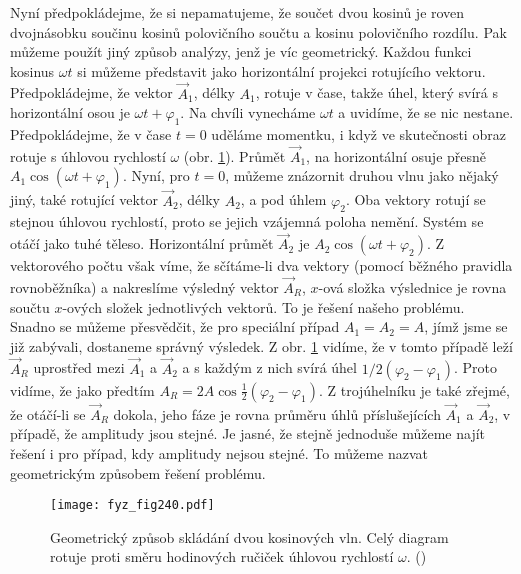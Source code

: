     Nyní předpokládejme, že si nepamatujeme, že součet dvou kosinů je roven dvojnásobku součinu 
    kosinů polovičního součtu a kosinu polovičního rozdílu. Pak můžeme použít jiný způsob analýzy, 
    jenž je víc geometrický. Každou funkci kosinus \(\omega t\) si můžeme představit jako 
    horizontální projekci rotujícího vektoru. Předpokládejme, že vektor \(\vec{A}_1\), délky 
    \(A_1\), rotuje v čase, takže úhel, který svírá s horizontální osou je \(\omega t + 
    \varphi_1\). Na chvíli vynecháme \(\omega t\) a uvidíme, že se nic nestane. Předpokládejme, že 
    v čase \(t=0\) uděláme momentku, i když ve skutečnosti obraz rotuje s úhlovou rychlostí 
    \(\omega\) (obr. \ref{fyz:fig240}). Průmět \(\vec{A}_1\), na horizontální osuje přesně 
    \(A_1\cos(\omega t + \varphi_1)\). Nyní, pro \(t = 0\), můžeme znázornit druhou vlnu jako 
    nějaký jiný, také rotující vektor \(\vec{A}_2\), délky \(A_2\), a pod úhlem \(\varphi_2\). Oba 
    vektory rotují se stejnou úhlovou rychlostí, proto se jejich vzájemná poloha nemění. Systém se 
    otáčí jako tuhé těleso. Horizontální průmět \(\vec{A}_2\) je \(A_2\cos(\omega t + \varphi_2)\). 
    Z vektorového počtu však víme, že sčítáme-li dva vektory (pomocí běžného pravidla rovnoběžníka) 
    a nakreslíme výsledný vektor \(\vec{A}_R\), \(x\)-ová složka výslednice je rovna součtu 
    \(x\)-ových složek jednotlivých vektorů. To je řešení našeho problému. Snadno se můžeme 
    přesvědčit, že pro speciální případ \(A_1 = A_2 = A\), jímž jsme se již zabývali, dostaneme 
    správný výsledek. Z obr. \ref{fyz:fig240} vidíme, že v tomto případě leží \(\vec{A}_R\) 
    uprostřed mezi \(\vec{A}_1\) a \(\vec{A}_2\) a s každým z nich svírá úhel \(1/2(\varphi_2 - 
    \varphi_1)\). Proto vidíme, že jako předtím \(A_R = 2A\cos\frac{1}{2}(\varphi_2 - \varphi_1)\). 
    Z trojúhelníku je také zřejmé, že otáčí-li se \(\vec{A}_R\) dokola, jeho fáze je rovna průměru 
    úhlů příslušejících \(\vec{A}_1\) a \(\vec{A}_2\), v případě, že amplitudy jsou stejné. Je
    jasné, že stejně jednoduše můžeme najít řešení i pro případ, kdy amplitudy nejsou stejné. To 
    můžeme nazvat geometrickým způsobem řešení problému.
    
    \begin{figure}[ht!] %
      \centering
      \texttt{[image: fyz\_fig240.pdf]}
      \caption{Geometrický způsob skládání dvou kosinových vln. Celý diagram rotuje proti směru 
               hodinových ručiček úhlovou rychlostí \(\omega\).
               (\cite[s.~387]{Feynman01})}
      \label{fyz:fig240}
    \end{figure}
    
